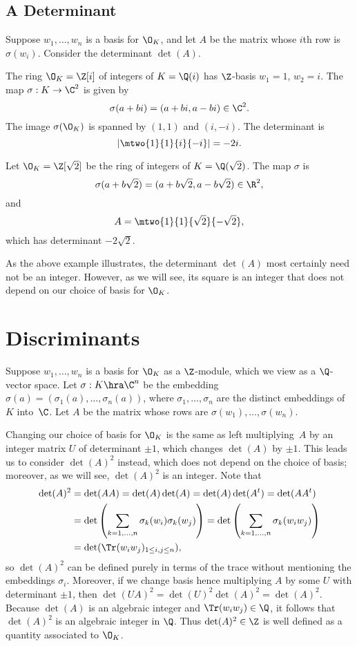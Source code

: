 \subsection{A Determinant}
 Suppose $w_1,\ldots, w_n$ is a basis for
$\O_K$, and let $A$ be the matrix whose $i$th row is $\sigma(w_i)$.
Consider the determinant $\det(A)$.
\begin{example}
The ring $\O_K=\Z[i]$ of integers of $K=\Q(i)$
has $\Z$-basis $w_1=1$, $w_2=i$.
The map $\sigma:K\to \C^2$ is given by
$$
   \sigma(a+bi) = (a+bi,a-bi)\in\C^2.
$$
The image $\sigma(\O_K)$ is spanned by
$(1,1)$ and $(i,-i)$.
The determinant is
\[
  \left|\mtwo{1}{1}{i}{-i}\right| = -2i.
\]

Let $\O_K=\Z[\sqrt{2}]$ be the ring of integers of $K=\Q(\sqrt{2})$.
The map $\sigma$ is
\[
  \sigma(a+b\sqrt{2}) = (a+b\sqrt{2},a-b\sqrt{2})\in\R^2,
\]
and
\[
A = \mtwo{1}{1}{\sqrt{2}}{-\sqrt{2}},
\]
which has determinant
$ -2\sqrt{2}$.
\end{example}
As the above example illustrates, the determinant $\det(A)$ most
certainly need not be an integer.  However, as we will see, its
square is an integer that does not depend on our choice of
basis for $\O_K$.

\section{Discriminants}\label{sec:disc}
Suppose $w_1,\ldots, w_n$ is a basis for $\O_K$ as a $\Z$-module,
which we view as a $\Q$-vector space.  Let $ \sigma : K\hra \C^n $ be
the embedding $\sigma(a)=(\sigma_1(a),\ldots,\sigma_n(a))$, where
$\sigma_1,\ldots, \sigma_n$ are the distinct embeddings of $K$
into~$\C$.  Let $A$ be the matrix whose rows are $\sigma(w_1), \ldots,
\sigma(w_n)$.

Changing our choice of
basis for $\O_K$ is the same as left multiplying~$A$ by an integer
matrix $U$ of determinant $\pm 1$, which changes
$\det(A)$ by $\pm 1$.
This leads us to consider $\det(A)^2$ instead, which does not depend
on the choice of basis; moreover, as we will see, $\det(A)^2$ is an integer.
Note that
\begin{align*}
\det(A)^2 &= \det(AA) =
\det(A)\det(A)=\det(A)\det(A^t)=
\det(A A^t) \\
 &= \det\left(\sum_{k=1,\ldots,n} \sigma_k(w_i)\sigma_k(w_j)\right)
 = \det\left(\sum_{k=1,\ldots,n} \sigma_k(w_i w_j)\right)\\
 &= \det(\Tr(w_i w_j)_{1\leq i,j\leq n}),
\end{align*}
so $\det(A)^2$ can be defined purely in terms of the trace without
mentioning the embeddings $\sigma_i$.
Moreover, if we change basis hence multiplying $A$ by some $U$ with determinant $\pm 1$, then
$\det(UA)^2 = \det(U)^2\det(A)^2 = \det(A)^2$.
Because $\det(A)$ is an algebraic integer and $\Tr(w_iw_j)\in\Q$, it follows
that $\det(A)^2$ is an algebraic integer in $\Q$.
Thus $\det(A)^2\in \Z$ is well defined as a quantity associated to $\O_K$.

